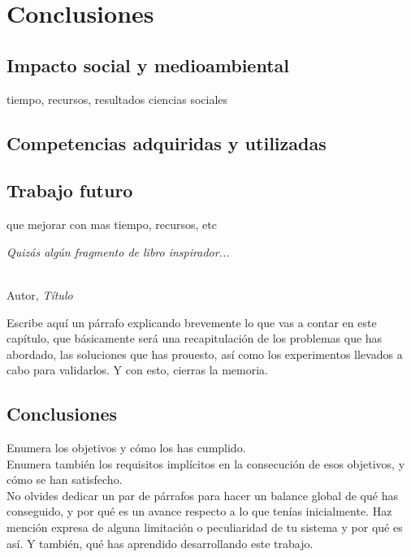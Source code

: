 \chapter{Conclusiones}
\label{cap:capitulo6}

\section{Impacto social y medioambiental}
tiempo, recursos, resultados ciencias sociales

\section{Competencias adquiridas y utilizadas}

\section{Trabajo futuro}
que mejorar con mas tiempo, recursos, etc

\begin{flushright}
\begin{minipage}[]{10cm}
\emph{Quizás algún fragmento de libro inspirador...}\\
\end{minipage}\\

Autor, \textit{Título}\\
\end{flushright}

\vspace{1cm}

Escribe aquí un párrafo explicando brevemente lo que vas a contar en este capítulo, que básicamente será una recapitulación de los problemas que has abordado, las soluciones que has prouesto, así como los experimentos llevados a cabo para validarlos. Y con esto, cierras la memoria.

\section{Conclusiones}

Enumera los objetivos y cómo los has cumplido.\\

Enumera también los requisitos implícitos en la consecución de esos objetivos, y cómo se han satisfecho.\\

No olvides dedicar un par de párrafos para hacer un balance global de qué has conseguido, y por qué es un avance respecto a lo que tenías inicialmente. Haz mención expresa de alguna limitación o peculiaridad de tu sistema y por qué es así. Y también, qué has aprendido desarrollando este trabajo.\\

